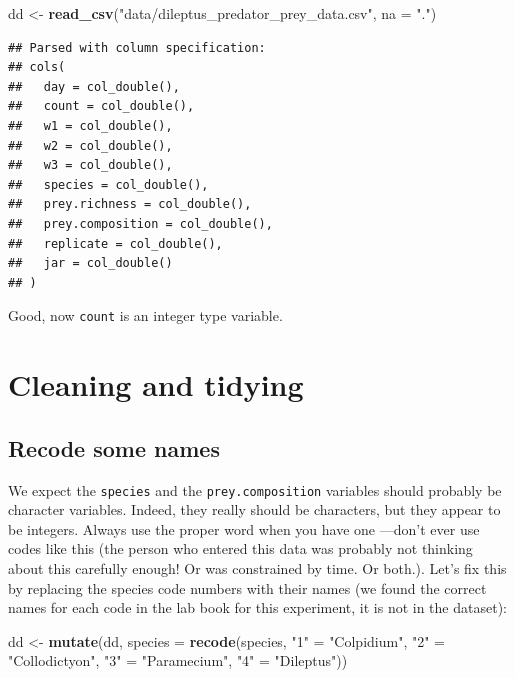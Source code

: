 \documentclass[]{book}
\newenvironment{Shaded}{\begin{snugshade}}{\end{snugshade}}
\newcommand{\DataTypeTok}[1]{\textcolor[rgb]{0.13,0.29,0.53}{#1}}
\newcommand{\KeywordTok}[1]{\textcolor[rgb]{0.13,0.29,0.53}{\textbf{#1}}}
\newcommand{\NormalTok}[1]{#1}
\newcommand{\StringTok}[1]{\textcolor[rgb]{0.31,0.60,0.02}{#1}}
\begin{document}
\begin{Shaded}
\begin{Highlighting}[]
\NormalTok{dd <-}\StringTok{ }\KeywordTok{read_csv}\NormalTok{(}\StringTok{"data/dileptus_predator_prey_data.csv"}\NormalTok{, }\DataTypeTok{na =} \StringTok{"."}\NormalTok{)}
\end{Highlighting}
\end{Shaded}

\begin{verbatim}
## Parsed with column specification:
## cols(
##   day = col_double(),
##   count = col_double(),
##   w1 = col_double(),
##   w2 = col_double(),
##   w3 = col_double(),
##   species = col_double(),
##   prey.richness = col_double(),
##   prey.composition = col_double(),
##   replicate = col_double(),
##   jar = col_double()
## )
\end{verbatim}

Good, now \texttt{count} is an integer type variable.

\hypertarget{cleaning-and-tidying}{%
\section{Cleaning and tidying}\label{cleaning-and-tidying}}

\hypertarget{recode-some-names}{%
\subsection{Recode some names}\label{recode-some-names}}

We expect the \texttt{species} and the \texttt{prey.composition} variables should probably be character variables. Indeed, they really should be characters, but they appear to be integers. Always use the proper word when you have one ---don't ever use codes like this (the person who entered this data was probably not thinking about this carefully enough! Or was constrained by time. Or both.). Let's fix this by replacing the species code numbers with their names (we found the correct names for each code in the lab book for this experiment, it is not in the dataset):

\begin{Shaded}
\begin{Highlighting}[]
\NormalTok{dd <-}\StringTok{ }\KeywordTok{mutate}\NormalTok{(dd, }\DataTypeTok{species =} \KeywordTok{recode}\NormalTok{(species,}
                                \StringTok{"1"}\NormalTok{ =}\StringTok{ "Colpidium"}\NormalTok{,}
                                \StringTok{"2"}\NormalTok{ =}\StringTok{ "Collodictyon"}\NormalTok{,}
                                \StringTok{"3"}\NormalTok{ =}\StringTok{ "Paramecium"}\NormalTok{,}
                                \StringTok{"4"}\NormalTok{ =}\StringTok{ "Dileptus"}\NormalTok{))}
\end{Highlighting}
\end{Shaded}
\end{document}
